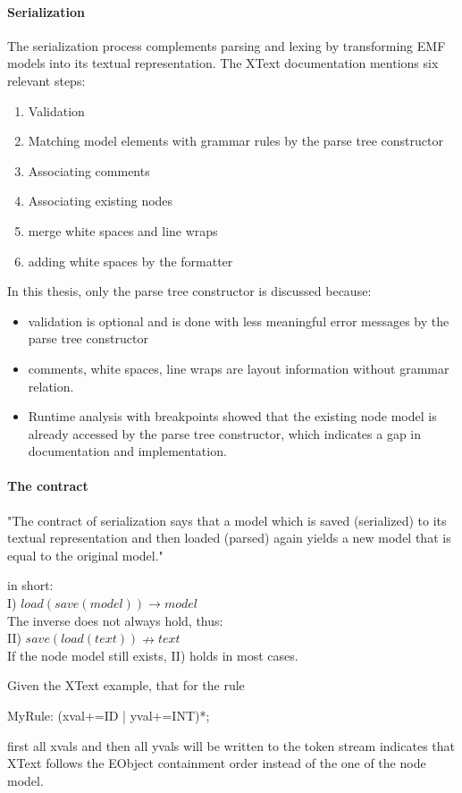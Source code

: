 \paragraph{Serialization}
The serialization process complements parsing and lexing by transforming EMF models into its textual representation. The XText documentation mentions six relevant steps:

\begin{enumerate}
	\item Validation
	\item Matching model elements with grammar rules by the parse tree constructor
	\item Associating comments
	\item Associating existing nodes
	\item merge white spaces and line wraps
	\item adding white spaces by the formatter
\end{enumerate}

In this thesis, only the parse tree constructor is discussed because:
\begin{itemize}
	\item validation is optional and is done with less meaningful error messages by the parse tree constructor
	\item comments, white spaces, line wraps are layout information without grammar relation.
	\item Runtime analysis with breakpoints showed that the existing node model is already accessed by the parse tree constructor, which indicates a gap in documentation and implementation.
\end{itemize}

\paragraph{The contract}
"The contract of serialization says that a model which is saved (serialized) to its textual representation and then loaded (parsed) again yields a new model that is equal to the original model."\cite{XTextMan}

in short:\\
I) $load(save(model)) \rightarrow model$\\
The inverse does not always hold, thus:\\
II) $save(load(text)) \nrightarrow text$\\
If the node model still exists, II) holds in most cases. 

Given the XText example, that for the rule
\begin{xtxt}
MyRule: (xval+=ID | yval+=INT)*; 
\end{xtxt}
first all xvals and then all yvals will be written to the token stream indicates that XText follows the  EObject containment order instead of the one of the node model.

